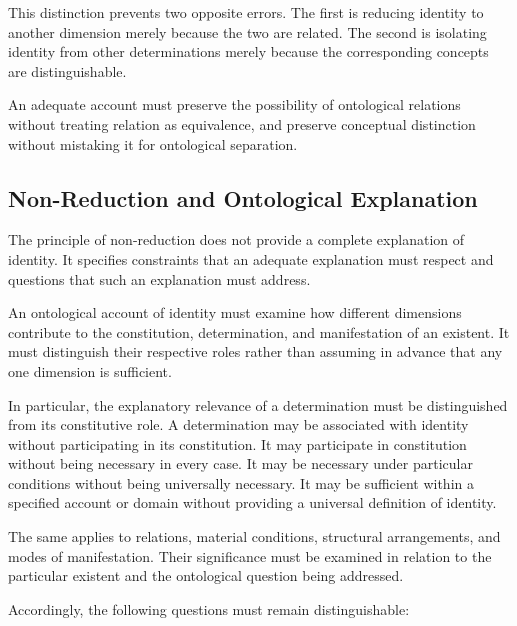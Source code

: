 This distinction prevents two opposite errors. The first
is reducing identity to another dimension merely because
the two are related. The second is isolating identity
from other determinations merely because the corresponding
concepts are distinguishable.

An adequate account must preserve the possibility of
ontological relations without treating relation as
equivalence, and preserve conceptual distinction without
mistaking it for ontological separation.

\subsection{Non-Reduction and Ontological Explanation}

The principle of non-reduction does not provide a complete
explanation of identity. It specifies constraints that
an adequate explanation must respect and questions that
such an explanation must address.

An ontological account of identity must examine how
different dimensions contribute to the constitution,
determination, and manifestation of an existent. It
must distinguish their respective roles rather than
assuming in advance that any one dimension is sufficient.

In particular, the explanatory relevance of a determination
must be distinguished from its constitutive role. A
determination may be associated with identity without
participating in its constitution. It may participate
in constitution without being necessary in every case.
It may be necessary under particular conditions without
being universally necessary. It may be sufficient within
a specified account or domain without providing a
universal definition of identity.

The same applies to relations, material conditions,
structural arrangements, and modes of manifestation.
Their significance must be examined in relation to the
particular existent and the ontological question being
addressed.

Accordingly, the following questions must remain
distinguishable:


